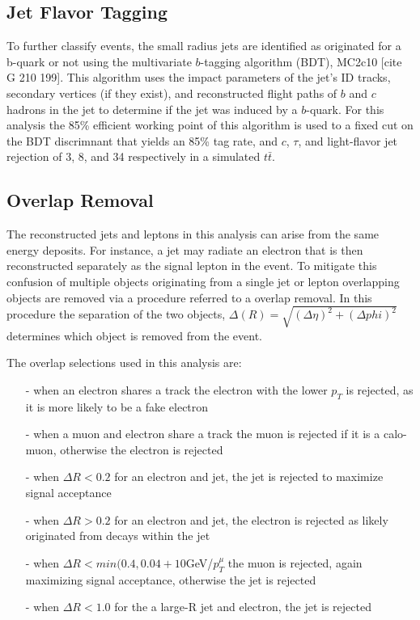 \subsection{Jet Flavor Tagging}
To further classify events, the small radius jets are identified as originated for a b-quark or not using the multivariate $b$-tagging algorithm (BDT), MC2c10 [cite G 210 199]. This algorithm uses the impact parameters of the jet's ID tracks, secondary vertices (if they exist), and reconstructed flight paths of $b$ and $c$ hadrons in the jet to determine if the jet was induced by a $b$-quark. For this analysis the 85\% efficient working point of this algorithm is used to a fixed cut on the BDT discrimnant that yields an 85\% tag rate, and $c$, $\tau$, and light-flavor jet rejection of 3, 8, and 34 respectively in a simulated $t\bar{t}$.


\subsection{Overlap Removal}
The reconstructed jets and leptons in this analysis can arise from the same energy deposits. For instance, a jet may radiate an electron that is then reconstructed separately as the signal lepton in the event. To mitigate this confusion of multiple objects originating from a single jet or lepton overlapping objects are removed via a procedure referred to a overlap removal. In this procedure the separation of the two objects, $\Delta (R) = \sqrt{(\Delta \eta)^{2}+(\Delta phi)^{2}}$ determines which object is removed from the event. 

The overlap selections used in this analysis are:

\begin{itemize}
\item[-] when an electron shares a track the electron with the lower $p_{T}$ is rejected, as it is more likely to be a fake electron
\item[-] when a muon and electron share a track the muon is rejected if it is a calo-muon, otherwise the electron is rejected
\item[-] when $\Delta R < 0.2$ for an electron and jet, the jet is rejected to maximize signal acceptance
\item[-] when $\Delta R > 0.2$ for an electron and jet, the electron is rejected as likely originated from decays within the jet
\item[-] when $\Delta R < min(0.4, 0.04+10$GeV/$p_{T}^{\mu}$ the muon is rejected, again maximizing signal acceptance, otherwise the jet is rejected
\item[-] when $\Delta R < 1.0$ for the a large-R jet and electron, the jet is rejected

\end{itemize}

